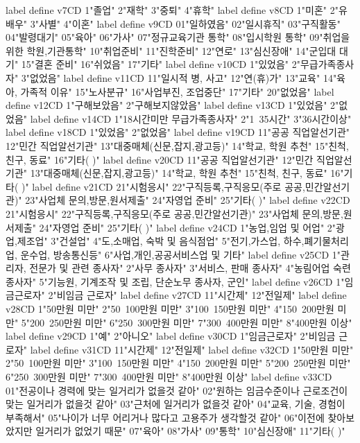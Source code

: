         label define v7CD 1"졸업" 2"재학" 3"중퇴" 4"휴학"
        label define v8CD 1"미혼" 2"유배우" 3"사별" 4"이혼"
        label define v9CD 01"일하였음" 02"일시휴직" 03"구직활동" 04"발령대기" 05"육아" 06"가사" 07"정규교육기관 통학" 08"입시학원 통학" 09"취업을 위한 학원,기관통학" 10"취업준비" 11"진학준비" 12"연로" 13"심신장애" 14"군입대 대기" 15"결혼 준비" 16"쉬었음" 17"기타"
        label define v10CD 1"있었음" 2"무급가족종사자" 3"없었음"
        label define v11CD 11"일시적 병, 사고" 12"연(휴)가" 13"교육" 14"육아, 가족적 이유" 15"노사분규" 16"사업부진, 조업중단" 17"기타" 20"없었음"
        label define v12CD 1"구해보았음" 2"구해보지않았음"
        label define v13CD 1"있었음" 2"없었음"
        label define v14CD 1"18시간미만 무급가족종사자" 2"1~35시간" 3"36시간이상"
        label define v18CD 1"있었음" 2"없었음"
        label define v19CD 11"공공 직업알선기관" 12"민간 직업알선기관" 13"대중매체(신문,잡지,광고등)" 14"학교, 학원 추천" 15"친척, 친구, 동료" 16"기타(  )"
        label define v20CD 11"공공 직업알선기관" 12"민간 직업알선기관" 13"대중매체(신문,잡지,광고등)" 14"학교, 학원 추천" 15"친척, 친구, 동료" 16"기타(  )"
        label define v21CD 21"시험응시" 22"구직등록,구직응모(주로 공공,민간알선기관)" 23"사업체 문의,방문,원서제출" 24"자영업 준비" 25"기타(  )"
        label define v22CD 21"시험응시" 22"구직등록,구직응모(주로 공공,민간알선기관)" 23"사업체 문의,방문,원서제출" 24"자영업 준비" 25"기타(  )"
        label define v24CD 1"농업,임업 및 어업" 2"광업,제조업" 3"건설업" 4"도,소매업, 숙박 및 음식점업" 5"전기,가스업, 하수,폐기물처리업, 운수업, 방송통신등" 6"사업,개인,공공서비스업 및 기타"
        label define v25CD 1"관리자, 전문가 및 관련 종사자" 2"사무 종사자" 3"서비스, 판매 종사자" 4"농림어업 숙련 종사자" 5"기능원, 기계조작 및 조립, 단순노무 종사자, 군인"
        label define v26CD 1"임금근로자" 2"비임금 근로자"
        label define v27CD 11"시간제" 12"전일제"
        label define v28CD 1"50만원 미만" 2"50~100만원 미만" 3"100~150만원 미만" 4"150~200만원 미만" 5"200~250만원 미만" 6"250~300만원 미만" 7"300~400만원 미만" 8"400만원 이상"
        label define v29CD 1"예" 2"아니오"
        label define v30CD 1"임금근로자" 2"비임금 근로자"
        label define v31CD 11"시간제" 12"전일제"
        label define v32CD 1"50만원 미만" 2"50~100만원 미만" 3"100~150만원 미만" 4"150~200만원 미만" 5"200~250만원 미만" 6"250~300만원 미만" 7"300~400만원 미만" 8"400만원 이상"
        label define v33CD 01"전공이나 경력에 맞는 일거리가 없을것 같아" 02"원하는 임금수준이나 근로조건이 맞는 일거리가 없을것 같아" 03"근처에 일거리가 없을것 같아" 04"교육, 기술, 경험이 부족해서" 05"나이가 너무 어리거나 많다고 고용주가 생각할것 같아" 06"이전에 찾아보았지만 일거리가 없었기 때문" 07"육아" 08"가사" 09"통학" 10"심신장애" 11"기타(  )"
